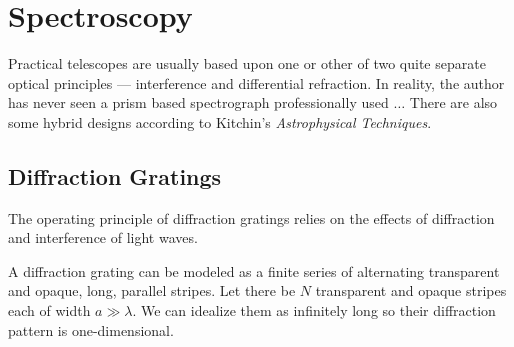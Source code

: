 %
\setcounter{count}{\value{enumi}}
\chapter{Spectroscopy}

Practical telescopes are usually based upon one or other of two quite separate optical
principles --- interference and differential refraction. In reality, the author has never
seen a prism based spectrograph professionally used $\ldots$ There are also some 
hybrid designs according to Kitchin's {\it Astrophysical Techniques}. 

\section{Diffraction Gratings}

The operating principle of diffraction gratings relies on the effects of diffraction 
and interference of light waves. 

A diffraction grating can be modeled as a finite series of alternating transparent 
and opaque, long, parallel stripes. Let there be $N$ transparent and opaque stripes 
each of width $a\gg\lambda$. We can idealize them as infinitely long so their diffraction
pattern is one-dimensional.

